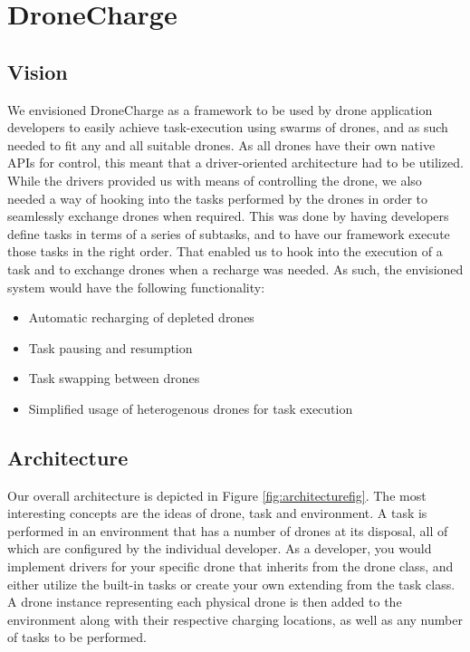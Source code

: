 \section{DroneCharge}
\subsection{Vision}
We envisioned DroneCharge as a framework to be used by drone application developers to easily achieve task-execution using swarms of drones, and as such needed to fit any and all suitable drones. As all drones have their own native APIs for control, this meant that a driver-oriented architecture had to be utilized. While the drivers provided us with means of controlling the drone, we also needed a way of hooking into the tasks performed by the drones in order to seamlessly exchange drones when required. This was done by having developers define tasks in terms of a series of subtasks, and to have our framework execute those tasks in the right order. That enabled us to hook into the execution of a task and to exchange drones when a recharge was needed. As such, the envisioned system would have the following functionality:

\begin{itemize}
    \itemsep0em
	\item Automatic recharging of depleted drones
	\item Task pausing and resumption
	\item Task swapping between drones
	\item Simplified usage of heterogenous drones for task execution
\end{itemize}

\subsection{Architecture}
Our overall architecture is depicted in Figure \ref{fig:architecturefig}. The most interesting concepts are the ideas of drone, task and environment. A task is performed in an environment that has a number of drones at its disposal, all of which are configured by the individual developer. As a developer, you would implement drivers for your specific drone that inherits from the drone class, and either utilize the built-in tasks or create your own extending from the task class. A drone instance representing each physical drone is then added to the environment along with their respective charging locations, as well as any number of tasks to be performed.

